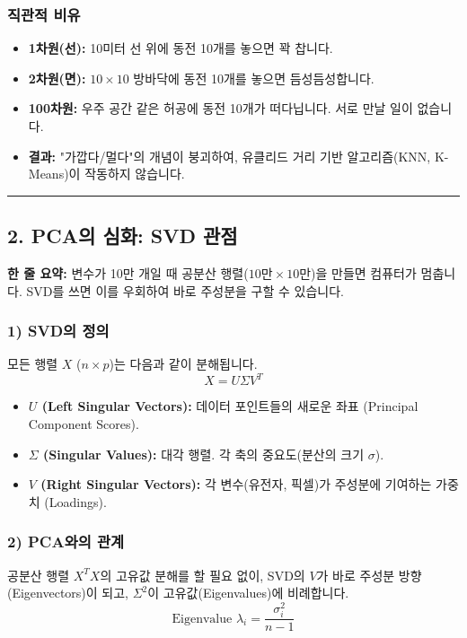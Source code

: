 \documentclass[11pt,a4paper]{book}
\theoremstyle{definition}
\begin{document}
\subsubsection*{직관적 비유}
\begin{itemize}
    \item \textbf{1차원(선):} 10미터 선 위에 동전 10개를 놓으면 꽉 찹니다.
    \item \textbf{2차원(면):} $10 \times 10$ 방바닥에 동전 10개를 놓으면 듬성듬성합니다.
    \item \textbf{100차원:} 우주 공간 같은 허공에 동전 10개가 떠다닙니다. 서로 만날 일이 없습니다.
    \item \textbf{결과:} "가깝다/멀다"의 개념이 붕괴하여, 유클리드 거리 기반 알고리즘(KNN, K-Means)이 작동하지 않습니다.
\end{itemize}

\vspace{0.5cm}\hrule\vspace{0.5cm}

\subsection{2. PCA의 심화: SVD 관점}


\begin{conceptbox}[title={개념 2: 공분산 행렬을 만들지 마라}]
\textbf{한 줄 요약:} 변수가 10만 개일 때 공분산 행렬($10만 \times 10만$)을 만들면 컴퓨터가 멈춥니다. SVD를 쓰면 이를 우회하여 바로 주성분을 구할 수 있습니다.
\end{conceptbox}

\subsubsection*{1) SVD의 정의}
모든 행렬 $X$ ($n \times p$)는 다음과 같이 분해됩니다.
$$ X = U \Sigma V^T $$
\begin{itemize}
    \item \textbf{$U$ (Left Singular Vectors):} 데이터 포인트들의 새로운 좌표 (Principal Component Scores).
    \item \textbf{$\Sigma$ (Singular Values):} 대각 행렬. 각 축의 중요도(분산의 크기 $\sigma$).
    \item \textbf{$V$ (Right Singular Vectors):} 각 변수(유전자, 픽셀)가 주성분에 기여하는 가중치 (Loadings).
\end{itemize}

\subsubsection*{2) PCA와의 관계}
공분산 행렬 $X^T X$의 고유값 분해를 할 필요 없이, SVD의 $V$가 바로 주성분 방향(Eigenvectors)이 되고, $\Sigma^2$이 고유값(Eigenvalues)에 비례합니다.
$$ \text{Eigenvalue } \lambda_i = \frac{\sigma_i^2}{n-1} $$
\end{document}
